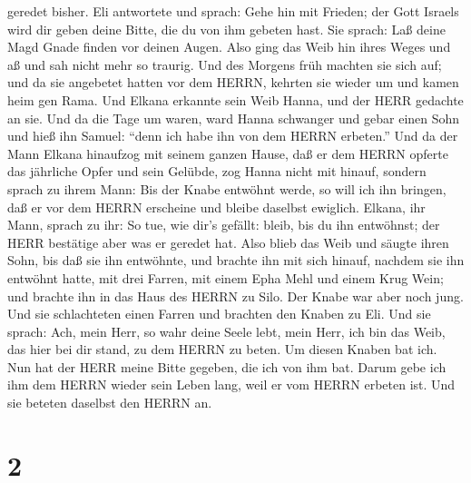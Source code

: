 geredet bisher.  Eli antwortete und sprach: Gehe hin mit
Frieden; der Gott Israels wird dir geben deine Bitte, die du von ihm
gebeten hast.  Sie sprach: Laß deine Magd Gnade finden vor
deinen Augen. Also ging das Weib hin ihres Weges und aß und sah nicht
mehr so traurig.  Und des Morgens früh machten sie sich
auf; und da sie angebetet hatten vor dem HERRN, kehrten sie wieder um
und kamen heim gen Rama. Und Elkana erkannte sein Weib Hanna, und der
HERR gedachte an sie.  Und da die Tage um waren, ward Hanna
schwanger und gebar einen Sohn und hieß ihn Samuel: ``denn ich habe ihn
von dem HERRN erbeten.''  Und da der Mann Elkana hinaufzog
mit seinem ganzen Hause, daß er dem HERRN opferte das jährliche Opfer
und sein Gelübde,  zog Hanna nicht mit hinauf, sondern
sprach zu ihrem Mann: Bis der Knabe entwöhnt werde, so will ich ihn
bringen, daß er vor dem HERRN erscheine und bleibe daselbst ewiglich.
 Elkana, ihr Mann, sprach zu ihr: So tue, wie dir's
gefällt: bleib, bis du ihn entwöhnst; der HERR bestätige aber was er
geredet hat. Also blieb das Weib und säugte ihren Sohn, bis daß sie ihn
entwöhnte,  und brachte ihn mit sich hinauf, nachdem sie
ihn entwöhnt hatte, mit drei Farren, mit einem Epha Mehl und einem Krug
Wein; und brachte ihn in das Haus des HERRN zu Silo. Der Knabe war aber
noch jung.  Und sie schlachteten einen Farren und brachten
den Knaben zu Eli.  Und sie sprach: Ach, mein Herr, so wahr
deine Seele lebt, mein Herr, ich bin das Weib, das hier bei dir stand,
zu dem HERRN zu beten.  Um diesen Knaben bat ich. Nun hat
der HERR meine Bitte gegeben, die ich von ihm bat.  Darum
gebe ich ihm dem HERRN wieder sein Leben lang, weil er vom HERRN erbeten
ist. Und sie beteten daselbst den HERRN an.

\hypertarget{section-1}{%
\section{2}\label{section-1}}

